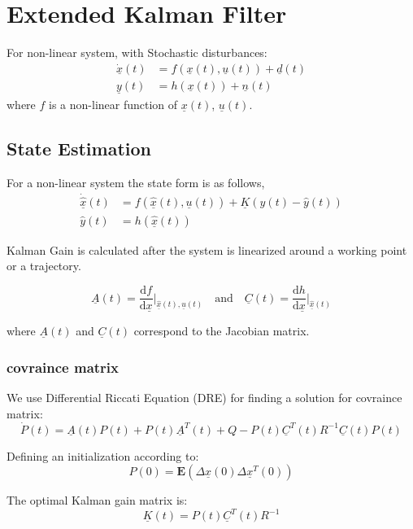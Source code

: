 
\section{Extended Kalman Filter}
For non-linear system, with Stochastic disturbances:
$$
\begin{aligned}
	\dot{\underline{x}}(t) &= f\left( \underline{x}(t), \underline{u}(t) \right) + \underline{d}(t) \\
	\underline{y}(t) &= h\left( \underline{x}(t) \right) + \underline{n}(t)
\end{aligned}
$$
where $f$ is a non-linear function of $\underline{x}(t)$, $\underline{u}(t)$.

\subsection{State Estimation}
For a non-linear system the state form is as follows,
$$
\begin{aligned}
	\dot{\hat{\underline{x}}}(t) &= f\left( \underline{\hat{x}}(t), \underline{u}(t) \right) + \underline{K}\left( y(t) - \hat{y}(t) \right) \\
	\hat{y}(t) &= h\left( \underline{\hat{x}}(t) \right)
\end{aligned}
$$

Kalman Gain is calculated after the system is linearized around a working point or a trajectory.

$$
\underline{A}(t) = \frac{\mathrm{d}f}{\mathrm{d}\underline{x}} \bigg|_{\underline{\hat{x}}(t), \underline{u}(t)} \quad \text{and} \quad
\underline{C}(t) = \frac{\mathrm{d}h}{\mathrm{d}\underline{x}} \bigg|_{\underline{\hat{x}}(t)}
$$

where $\underline{A}(t)$ and $\underline{C}(t)$ correspond to the Jacobian matrix.

\subsubsection{covraince matrix}
We use Differential Riccati Equation (DRE) for finding a solution for covraince matrix:
$$
\dot{P}(t) = \underline{A}(t) P(t) + P(t) \underline{A}^T(t) + Q - P(t) \underline{C}^T(t) R^{-1} \underline{C}(t) P(t)
$$

Defining an initialization according to:
$$
P(0) = \mathbf{E}(\Delta\underline{x}(0) \Delta\underline{x}^T(0))
$$

The optimal Kalman gain matrix is:
$$
\underline{K}(t) = P(t) \underline{C}^T(t) R^{-1}
$$

